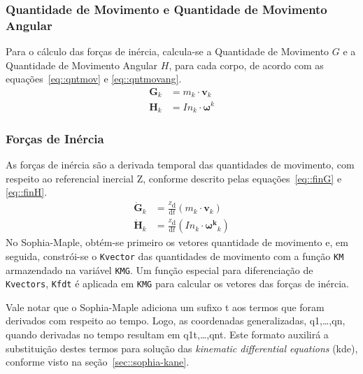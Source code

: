 \bigskip {}

\subsubsection{Quantidade de Movimento e Quantidade de Movimento Angular}

Para o cálculo das forças de inércia, calcula-se a Quantidade de Movimento $G$ e
a Quantidade de Movimento Angular $H$, para cada corpo, de acordo com as
equações~\ref{eq::qntmov} e \ref{eq::qntmovang}.
%
\begin{align}
	\mathbf{G}_{k} &= m_{k} \cdot \mathbf{v}_{k} \label{eq::qntmov} \\
	\mathbf{H}_{k} &= In_{k} \cdot \boldsymbol\omega^{k} \label{eq::qntmovang}
\end{align}
%

\subsubsection{Forças de Inércia}

As forças de inércia são a derivada temporal das quantidades de movimento, com
respeito ao referencial inercial Z, conforme descrito pelas
equações~\ref{eq::finG} e \ref{eq::finH}.
%
\begin{align}
	\dot{\mathbf{G}}_{k} &= \frac{^{Z}\mathrm{d}}{\mathrm{d} t} (m_{k} \cdot
	\mathbf{v}_{k}) \label{eq::finG} \\
	\dot{\mathbf{H}}_{k} &= \frac{^{Z}\mathrm{d}}{\mathrm{d} t} (In_{k} \cdot
	\mathbf{\boldsymbol\omega^{k}}_{k}) \label{eq::finH}	
\end{align}
%
No Sophia-Maple, obtém-se primeiro os vetores quantidade de movimento e, em
seguida, constrói-se o \texttt{Kvector} das quantidades de movimento com a
função \texttt{KM} armazendado na variável \texttt{KMG}. Um função especial para
diferenciação de \texttt{Kvectors}, \texttt{Kfdt} é aplicada em \texttt{KMG} para
calcular os vetores das forças de inércia.

Vale notar que o Sophia-Maple adiciona um sufixo t aos termos que foram
derivados com respeito ao tempo.
Logo, as coordenadas generalizadas, q1,\ldots,qn, quando derivadas no tempo
resultam em q1t,\ldots,qnt. Este formato auxilirá a substituição destes termos
para solução das \textit{kinematic differential equations} (kde), conforme visto
na seção~\ref{sec::sophia-kane}.

